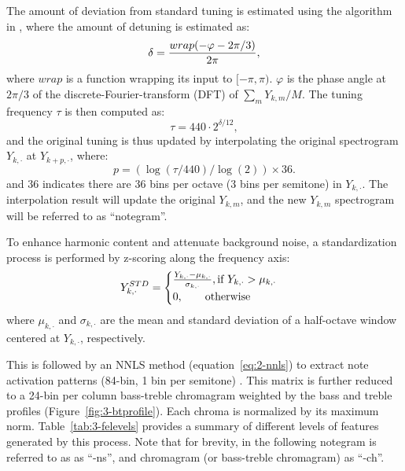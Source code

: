 The amount of deviation from standard tuning is estimated using the algorithm in \cite{dressler2007tuning}, where the amount of detuning is estimated as:
\begin{equation}\label{eq:3-tuning}
	\delta = { {wrap(-\varphi-{2\pi}/3)} \over {2\pi} },
\end{equation}
where $wrap$ is a function wrapping its input to $[-\pi,\pi)$. $\varphi$ is the phase angle at $2\pi/3$ of the discrete-Fourier-transform (DFT) of ${\sum_m Y_{k,m}} / M$. The tuning frequency $\tau$ is then computed as:
\begin{equation}
	\tau=440\cdot2^{\delta/12},
\end{equation}
and the original tuning is thus updated by interpolating the original spectrogram $Y_{k,\cdot}$ at $Y_{{k+p},\cdot}$, where:
\begin{equation}
	p = (\log(\tau / 440) / \log(2)) \times 36.
\end{equation}
and 36 indicates there are 36 bins per octave (3 bins per semitone) in $Y_{k,\cdot}$. The interpolation result will update the original $Y_{k,m}$, and the new $Y_{k,m}$ spectrogram will be referred to as ``notegram''.

To enhance harmonic content and attenuate background noise, a standardization process is performed by z-scoring along the frequency axis:
\begin{equation}
	Y^{STD}_{k,\cdot} = 
	\begin{cases}
		{{Y_{k,\cdot} - \mu_{k,\cdot}} \over \sigma_{k,\cdot}}, \text{if } Y_{k,\cdot} > \mu_{k,\cdot}\\
		0, \quad\quad\text{otherwise}
	\end{cases}
\end{equation}
where $\mu_{k,\cdot}$ and $\sigma_{k,\cdot}$ are the mean and standard deviation of a half-octave window centered at $Y_{k,\cdot}$, respectively.

This is followed by an NNLS method  (equation~\ref{eq:2-nnls}) to extract note activation patterns (84-bin, 1 bin per semitone) \cite{mauch2010approximate}. This matrix is further reduced to a 24-bin per column bass-treble chromagram weighted by the bass and treble profiles (Figure~\ref{fig:3-btprofile}). Each chroma is normalized by its maximum norm. Table~\ref{tab:3-felevels} provides a summary of different levels of features generated by this process. Note that for brevity, in the following notegram is referred to as as ``-ns'', and chromagram (or bass-treble chromagram) as ``-ch''.

